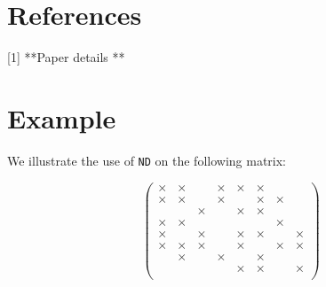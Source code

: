\section*{References}
[1] **Paper details **




\section{Example}

We illustrate the use of {\tt ND} on the following matrix: 

$$
	\left(\begin{array}{cccccccc}
   \times &  \times  &         &  \times  &  \times  & \times &          &           \\
   \times &  \times  &         &  \times  &          & \times &  \times  &           \\ 
          &          & \times  &          &  \times  & \times &          &           \\
   \times &  \times  &         &          &          &        &  \times  &           \\ 
   \times &          & \times  &          &  \times  & \times &          &   \times  \\ 
   \times &  \times  & \times  &          &  \times  &        &  \times  &   \times  \\ 
          &  \times  &         &  \times  &          & \times &          &           \\ 
          &          &         &          &  \times  & \times &          &   \times  \\ 
	\end{array}\right)
$$


\smallskip


